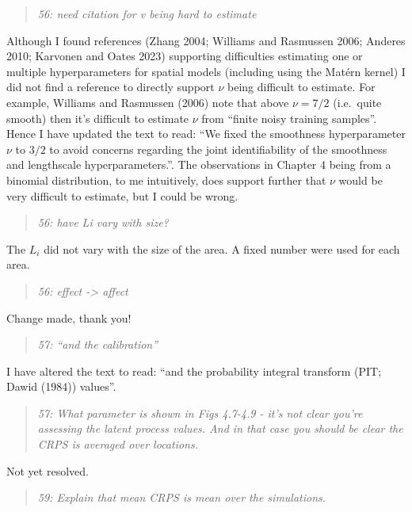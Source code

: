 \documentclass[
  12pt,
]{article}
\begin{document}
\begin{quote}
\emph{56: need citation for v being hard to estimate}
\end{quote}

Although I found references (Zhang 2004; Williams and Rasmussen 2006;
Anderes 2010; Karvonen and Oates 2023) supporting difficulties
estimating one or multiple hyperparameters for spatial models (including
using the Matérn kernel) I did not find a reference to directly support
\(\nu\) being difficult to estimate. For example, Williams and Rasmussen
(2006) note that above \(\nu = 7/2\) (i.e.~quite smooth) then it's
difficult to estimate \(\nu\) from ``finite noisy training samples''.
Hence I have updated the text to read: ``We fixed the smoothness
hyperparameter \(\nu\) to \(3/2\) to avoid concerns regarding the joint
identifiability of the smoothness and lengthscale hyperparameters.''.
The observations in Chapter 4 being from a binomial distribution, to me
intuitively, does support further that \(\nu\) would be very difficult
to estimate, but I could be wrong.

\begin{quote}
\emph{56: have Li vary with size?}
\end{quote}

The \(L_i\) did not vary with the size of the area. A fixed number were
used for each area.

\begin{quote}
\emph{56: effect -\textgreater{} affect}
\end{quote}

Change made, thank you!

\begin{quote}
\emph{57: ``and the calibration''}
\end{quote}

I have altered the text to read: ``and the probability integral
transform (PIT; Dawid (1984)) values''.

\begin{quote}
\emph{57: What parameter is shown in Figs 4.7-4.9 - it's not clear
you're assessing the latent process values. And in that case you should
be clear the CRPS is averaged over locations.}
\end{quote}

Not yet resolved.

\begin{quote}
\emph{59: Explain that mean CRPS is mean over the simulations.}
\end{quote}
\end{document}
